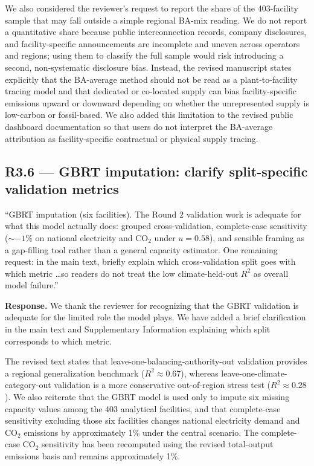 \documentclass[11pt]{article}
\newenvironment{revquote}{%
  \begin{mdframed}[
    leftmargin=0.5em,
    rightmargin=0.5em,
    linewidth=0pt,
    backgroundcolor=gray!8,
    skipabove=0.5em,
    skipbelow=0.5em,
    innertopmargin=0.6em,
    innerbottommargin=0.6em,
    innerleftmargin=0.8em,
    innerrightmargin=0.8em
  ]%
  \itshape%
}{%
  \end{mdframed}%
}
\begin{document}
We also considered the reviewer's request to report the share of the 403-facility sample that may fall outside a simple regional BA-mix reading. We do not report a quantitative share because public interconnection records, company disclosures, and facility-specific announcements are incomplete and uneven across operators and regions; using them to classify the full sample would risk introducing a second, non-systematic disclosure bias. Instead, the revised manuscript states explicitly that the BA-average method should not be read as a plant-to-facility tracing model and that dedicated or co-located supply can bias facility-specific emissions upward or downward depending on whether the unrepresented supply is low-carbon or fossil-based. We also added this limitation to the revised public dashboard documentation so that users do not interpret the BA-average attribution as facility-specific contractual or physical supply tracing.

\subsection*{R3.6 --- GBRT imputation: clarify split-specific validation metrics}

\begin{revquote}
``GBRT imputation (six facilities). The Round 2 validation work is adequate for what this model actually does: grouped cross-validation, complete-case sensitivity ($\sim -1\%$ on national electricity and CO$_2$ under $u = 0.58$), and sensible framing as a gap-filling tool rather than a general capacity estimator. One remaining request: in the main text, briefly explain which cross-validation split goes with which metric \ldots so readers do not treat the low climate-held-out $R^2$ as overall model failure.''
\end{revquote}

\textbf{Response.} We thank the reviewer for recognizing that the GBRT validation is adequate for the limited role the model plays. We have added a brief clarification in the main text and Supplementary Information explaining which split corresponds to which metric.

The revised text states that leave-one-balancing-authority-out validation provides a regional generalization benchmark ($R^2 \approx 0.67$), whereas leave-one-climate-category-out validation is a more conservative out-of-region stress test ($R^2 \approx 0.28$). We also reiterate that the GBRT model is used only to impute six missing capacity values among the 403 analytical facilities, and that complete-case sensitivity excluding those six facilities changes national electricity demand and CO$_2$ emissions by approximately 1\% under the central scenario. The complete-case CO$_2$ sensitivity has been recomputed using the revised total-output emissions basis and remains approximately 1\%.
\end{document}
